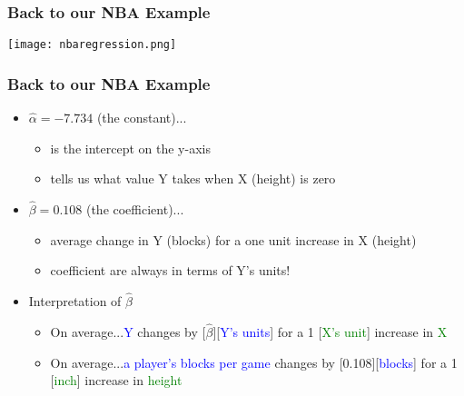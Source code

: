 \documentclass[handout]{beamer}
\newcommand{\blue}{\textcolor{blue}}
\newcommand{\green}{\textcolor{green}}
\begin{document}
\begin{frame}
 \frametitle{Back to our NBA Example}
 \begin{center}
 \texttt{[image: nbaregression.png]}
 \end{center}
\end{frame}

\begin{frame}
 \frametitle{Back to our NBA Example}
 \begin{itemize}[<+->]
   \item $\hat{\alpha} = -7.734 $ (the \alert{constant})...
     \begin{itemize}
       \item is the intercept on the y-axis
       \item tells us what value Y takes when X (height) is zero
     \end{itemize}
   \item $\hat{\beta} = 0.108$ (the \alert{coefficient})...
     \begin{itemize}
       \item average change in Y (blocks) for a one unit increase in X (height)
       \item coefficient are always in  terms  of Y's units!
     \end{itemize}
   \item Interpretation of $\hat{\beta}$
      \begin{itemize}
        \item On average...\blue{Y} changes by [\alert{$\hat{\beta}$}][\blue{Y's units}] for a 1 [\green{X's unit}] increase in \green{X}
        \item On average...\blue{a player's blocks per game } changes by [\alert{0.108}][\blue{blocks}] for a 1 [\green{inch}] increase in \green{height}
      \end{itemize}
 \end{itemize}
\end{frame}
\end{document}
